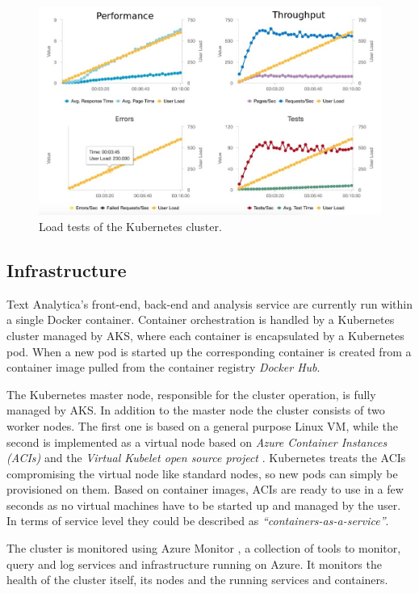 \documentclass[conference]{IEEEtran}
\begin{document}
\begin{figure}[ht!]
\includegraphics[width=170mm]{img/loadtest_01.png}
\caption{Load tests of the Kubernetes cluster.}
\label{img:loadtesting}
\end{figure}

\subsection{Infrastructure}
Text Analytica’s front-end, back-end and analysis service are currently run within a single Docker container. Container orchestration is handled by a Kubernetes cluster managed by AKS, where each container is encapsulated by a Kubernetes pod. When a new pod is started up the corresponding container is created from a container image pulled from the container registry \textit{Docker Hub}\cite{DockerHub}.

The Kubernetes master node, responsible for the cluster operation, is fully managed by AKS. In addition to the master node the cluster consists of two worker nodes. The first one is based on a general purpose Linux VM, while the second is implemented as a virtual node based on \textit{Azure Container Instances (ACIs)} \cite{AzureContainerInstances} and the \textit{Virtual Kubelet open source project} \cite{VirtualKubelet} \cite{VirtualKubeletGithub}. Kubernetes treats the ACIs compromising the virtual node like standard nodes, so new pods can simply be provisioned on them. Based on container images, ACIs are ready to use in a few seconds as no virtual machines have to be started up and managed by the user. In terms of service level they could be described as \textit{“containers-as-a-service”}.

The cluster is monitored using Azure Monitor \cite{AzureMonitor}, a collection of tools to monitor, query and log services and infrastructure running on Azure. It monitors the health of the cluster itself, its nodes and the running services and containers.
\end{document}
